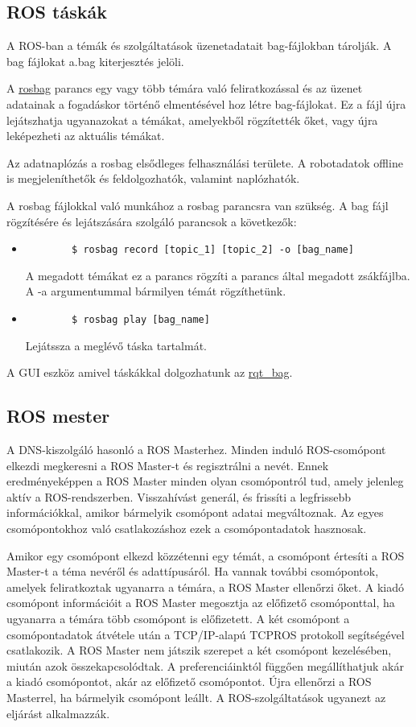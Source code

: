 \documentclass{article}
\begin{document}
\subsection{ROS táskák}
A ROS-ban a témák és szolgáltatások üzenetadatait bag-fájlokban tárolják. A bag fájlokat a.bag kiterjesztés jelöli.

A \href{http://wiki.ros.org/rosbag/Commandline}{rosbag} parancs egy vagy több témára való feliratkozással és az üzenet adatainak a fogadáskor történő elmentésével hoz létre bag-fájlokat. Ez a fájl újra lejátszhatja ugyanazokat a témákat, amelyekből rögzítették őket, vagy újra leképezheti az aktuális témákat.

Az adatnaplózás a rosbag elsődleges felhasználási területe. A robotadatok offline is megjeleníthetők és feldolgozhatók, valamint naplózhatók.

A rosbag fájlokkal való munkához a rosbag parancsra van szükség. A bag fájl rögzítésére és lejátszására szolgáló parancsok a következők:
\begin{itemize}
    \item \begin{verbatim}
        $ rosbag record [topic_1] [topic_2] -o [bag_name]
    \end{verbatim}A megadott témákat ez a parancs rögzíti a parancs által megadott zsákfájlba. A -a argumentummal bármilyen témát rögzíthetünk.
    \item \begin{verbatim}
        $ rosbag play [bag_name]
    \end{verbatim}Lejátssza a meglévő táska tartalmát.
\end{itemize}
A GUI eszköz amivel táskákkal dolgozhatunk az \href{http://wiki.ros.org/rqt_bag}{rqt\_bag}.

\subsection{ROS mester}
A DNS-kiszolgáló hasonló a ROS Masterhez. Minden induló ROS-csomópont elkezdi megkeresni a ROS Master-t és regisztrálni a nevét. Ennek eredményeképpen a ROS Master minden olyan csomópontról tud, amely jelenleg aktív a ROS-rendszerben. Visszahívást generál, és frissíti a legfrissebb információkkal, amikor bármelyik csomópont adatai megváltoznak. Az egyes csomópontokhoz való csatlakozáshoz ezek a csomópontadatok hasznosak.

Amikor egy csomópont elkezd közzétenni egy témát, a csomópont értesíti a ROS Master-t a téma nevéről és adattípusáról. Ha vannak további csomópontok, amelyek feliratkoztak ugyanarra a témára, a ROS Master ellenőrzi őket. A kiadó csomópont információit a ROS Master megosztja az előfizető csomóponttal, ha ugyanarra a témára több csomópont is előfizetett. A két csomópont a csomópontadatok átvétele után a TCP/IP-alapú TCPROS protokoll segítségével csatlakozik. A ROS Master nem játszik szerepet a két csomópont kezelésében, miután azok összekapcsolódtak. A preferenciáinktól függően megállíthatjuk akár a kiadó csomópontot, akár az előfizető csomópontot. Újra ellenőrzi a ROS Masterrel, ha bármelyik csomópont leállt. A ROS-szolgáltatások ugyanezt az eljárást alkalmazzák.
\end{document}
